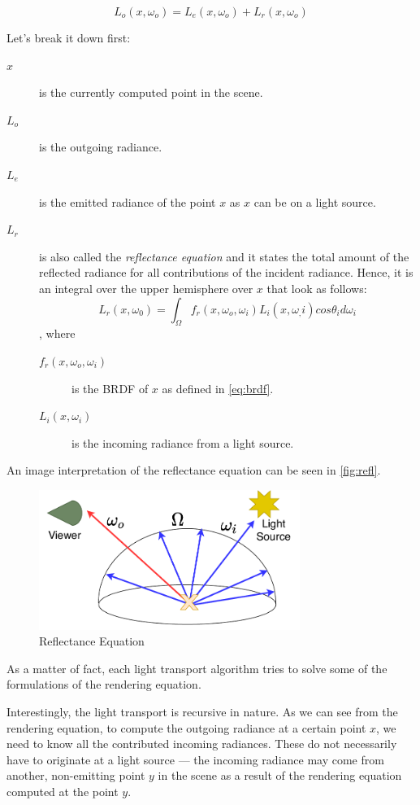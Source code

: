 \begin{equation}
L_o(x,\omega_o)=L_e(x,\omega_o)+L_r(x,\omega_o)
\end{equation}

Let's break it down first:
\begin{description}
	\item[$x$] is the currently computed point in the scene.
	\item[$L_o$] is the outgoing radiance.
	\item[$L_e$] is the emitted radiance of the point $x$ as $x$ can be on a light source.
	\item[$L_r$] is also called the \emph{reflectance equation} and it states the total amount of the reflected radiance for all contributions of the incident radiance. Hence, it is an integral over the upper hemisphere over $x$ that look as follows:
	\begin{equation}
	L_r(x,\omega_0)=\int_{\Omega}f_r(x,\omega_o,\omega_i) L_i(x,\omega_,i) cos\theta_i d\omega_i
	\end{equation}
	, where
	\begin{description}
		\item[$f_r(x,\omega_o,\omega_i)$] is the BRDF of $x$ as defined in \autoref{eq:brdf}.
		\item[$L_i(x,\omega_i)$] is the incoming radiance from a light source.
	\end{description}
\end{description}

An image interpretation of the reflectance equation can be seen in \autoref{fig:refl}.

\begin{figure}[h]
	\centering
	\includegraphics[width=85mm]{img/refl.pdf}
	\caption{Reflectance Equation}
	\label{fig:refl}
\end{figure}

As a matter of fact, each light transport algorithm tries to solve some of the formulations of the rendering equation.

Interestingly, the light transport is recursive in nature. As we can see from the rendering equation, to compute the outgoing radiance at a certain point $x$, we need to know all the contributed incoming radiances. These do not necessarily have to originate at a light source --- the incoming radiance may come from another, non-emitting point $y$ in the scene as a result of the rendering equation computed at the point $y$.

